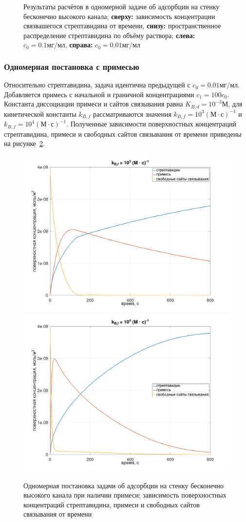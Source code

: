 \documentclass[oneside,final,12pt]{extreport}
\begin{document}
\begin{figure}
  \caption{\label{fig:flat_wide_onecomp_onedim_probe_distrib}%
    Результаты расчётов в одномерной задаче об адсорбции
    на стенку бесконечно высокого канала;
    \textbf{сверху:} зависимость концентрации связвашегося стрептавидина от времени,
    \textbf{снизу:} пространственное распределение стрептавидина по объёму раствора;
    \textbf{слева:} $c_0 = 0.1 \text{мг}/\text{мл}$,
    \textbf{справа:} $c_0 = 0.01 \text{мг}/\text{мл}$
  }

\end{figure}

\subsubsection*{Одномерная постановка с примесью}
Относительно стрептавидина, задача идентична предыдущей
с $c_0 = 0.01 \text{мг}/\text{мл}$.
Добавляется примесь с начальной и граничной концентрациями
$c_1 = 100 c_0$.
Константа диссоциации примеси и сайтов связывания равна
$K_{B,d} = 10^{-3} \text{М}$,
для кинетической константы $k_{B,f}$ рассматриваются значения
$k_{B,f} = 10^3 \left(\text{М} \cdot \text{с}\right)^{-1}$ и
$k_{B,f} = 10^4 \left(\text{М} \cdot \text{с}\right)^{-1}$.
Полученные зависимости поверхностных концентраций
стрептавидина, примеси и свободных сайтов связывания от времени
приведены на рисунке~\ref{fig:flat_wide_twobulk_paramsweep}.

\begin{figure}
  \centering
  \includegraphics[width=.6\textwidth]{pic/flat_wide_two_bulk_paramsweep_3}
  \includegraphics[width=.6\textwidth]{pic/flat_wide_two_bulk_paramsweep_4}

  \caption{%
    \label{fig:flat_wide_twobulk_paramsweep}%
    Одномерная постановка задачи об адсорбции на стенку бесконечно высокого канала
    при наличии примеси;
    зависимость поверхностных концентраций стрептавидина, примеси и
    свободных сайтов связывания от времени
  }
\end{figure}
\end{document}
